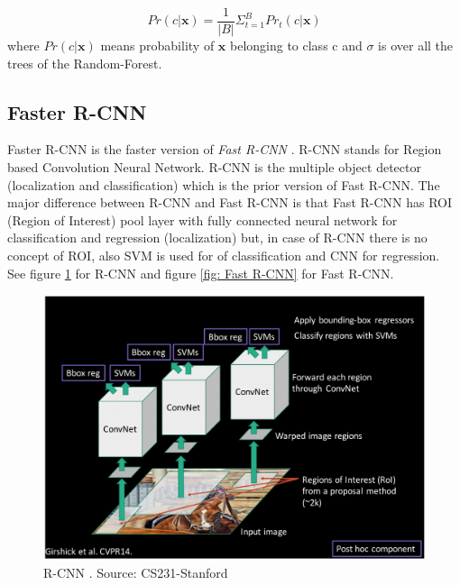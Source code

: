 \documentclass{report}
\begin{document}
\begin{equation}\label{eq: random-forest_avg_eq}
        Pr(c|\boldsymbol{x}) = \frac{1}{|B|} \Sigma^{B}_{t=1} Pr_t(c|\boldsymbol{x})
\end{equation}
where $Pr(c|\boldsymbol{x})$ means probability of $\boldsymbol{x}$  belonging to class c and $\sigma$ is over all the trees of the Random-Forest.

\subsection{Faster R-CNN}
Faster R-CNN \cite{ren2015faster} is the  faster version of \textit{Fast R-CNN} \cite{girshick2015fast}. R-CNN stands for Region based Convolution Neural Network. R-CNN is the multiple object detector (localization and classification) which is the prior version of Fast R-CNN. The major difference between R-CNN \cite{girshick2014richrcnn} and Fast R-CNN \cite{girshick2015fast} is that Fast R-CNN has ROI (Region of Interest) pool layer with fully connected neural network for classification and regression (localization) but, in case of R-CNN  there is no concept of ROI, also SVM is used for of classification and CNN for regression.  See figure \ref{fig: R-CNN} for R-CNN and figure \ref{fig: Fast R-CNN} for Fast R-CNN.


\begin{figure}[H]
\includegraphics[width=0.85\linewidth]{R-CNN.png}
\centering
\captionsetup{justification=centering}
\caption{R-CNN \cite{girshick2014richrcnn} . Source: CS231-Stanford\protect\footnotemark}
\label{fig: R-CNN}
\end{figure}
\end{document}
